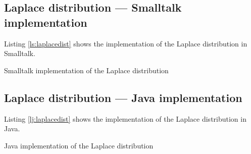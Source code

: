 \documentclass[twoside]{book}
\begin{document}
\subsection{Laplace distribution --- Smalltalk  implementation}
Listing \ref{ls:laplacedist} shows the implementation of the
Laplace distribution in Smalltalk.

\begin{listing} Smalltalk implementation of the Laplace distribution \label{ls:laplacedist}

\end{listing}

\subsection{Laplace distribution --- Java  implementation}
Listing \ref{lj:laplacedist} shows the implementation of the
Laplace distribution in Java.

\begin{listing} Java implementation of the Laplace distribution \label{lj:laplacedist}

\end{listing}
\end{document}

